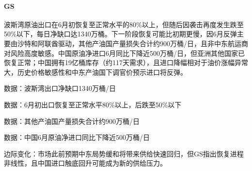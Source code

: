 \documentclass[11pt]{ctexart}
\begin{document}
\paragraph{GS} 波斯湾原油出口在6月初恢复至正常水平的80\%以上，但随后因袭击再度发生跌至50\%以下，每日净缺口达1340万桶。下一阶段恢复可能比初期更慢，因6月反弹主要由沙特和阿联酋驱动，其他产油国产量损失合计约900万桶/日，且非中东航运商对风险高度敏感。中国原油净进口6月同比下降近500万桶/日，但亚洲其他国家已恢复正常；中国拥有19亿桶库存（约117天需求），且进口降幅相对于油价涨幅异常大，历史价格敏感性和中东产油国下调官价预示进口将反弹。
{\small\color{refgray}数据：波斯湾出口净缺口1340万桶/日\par}
{\small\color{refgray}数据：6月初出口恢复至正常水平80\%以上，后跌至50\%以下\par}
{\small\color{refgray}数据：其他产油国产量损失合计约900万桶/日\par}
{\small\color{refgray}数据：中国6月原油净进口同比下降近500万桶/日\par}
{\small\color{refgray}边际变化：市场此前预期中东局势缓和将带来供给快速回归，但GS指出恢复进程非线性，且中国进口触底回升可能成为新的供给压力。\par}
\end{document}
